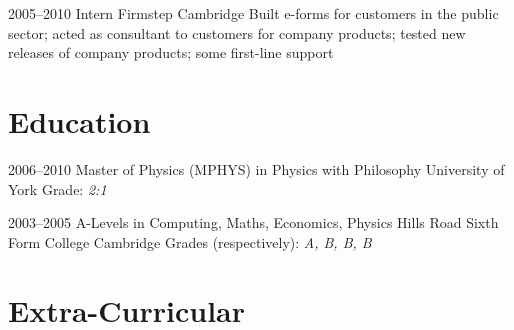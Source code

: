 \documentclass[11pt,a4paper]{moderncv}
\begin{document}
\cventry
  {2005--2010}
  {Intern}
  {Firmstep}
  {Cambridge}
  {}
  {
    Built e-forms for customers in the public sector; acted as consultant to customers for company products; tested new releases of company products; some first-line support
  }

\section{Education}

\cventry
  {2006--2010}
  {\small{Master of Physics (MPHYS) in Physics with Philosophy}}
  {\newline{}University of York}
  {}
  {\small{Grade: \textit{2:1}}}
  {}

\cventry
  {2003--2005}
  {A-Levels in Computing, Maths, Economics, Physics}
  {\newline{}Hills Road Sixth Form College}
  {Cambridge}
  {Grades (respectively): \textit{A, B, B, B}}
  {}

\section{Extra-Curricular}

\end{document}
